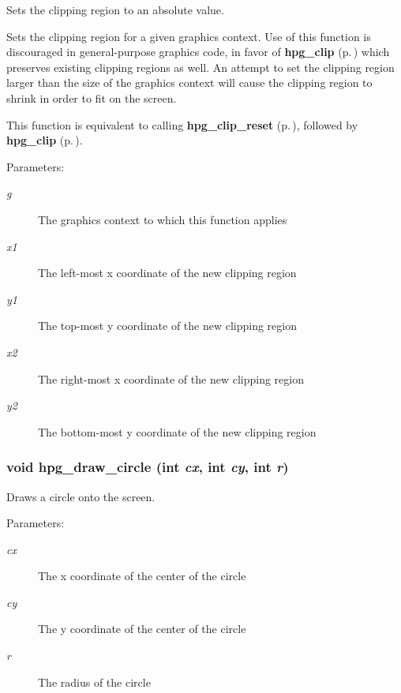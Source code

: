 Sets the clipping region to an absolute value.

Sets the clipping region for a given graphics context. Use of this function is discouraged in general-purpose graphics code, in favor of {\bf hpg\_\-clip} {\rm (p.\,\pageref{hpgraphics_8h_a37})} which preserves existing clipping regions as well. An attempt to set the clipping region larger than the size of the graphics context will cause the clipping region to shrink in order to fit on the screen.

This function is equivalent to calling {\bf hpg\_\-clip\_\-reset} {\rm (p.\,\pageref{hpgraphics_8h_a35})}, followed by {\bf hpg\_\-clip} {\rm (p.\,\pageref{hpgraphics_8h_a37})}.\begin{Desc}
\item[Parameters: ]\par
\begin{description}
\item[{\em 
g}]The graphics context to which this function applies \item[{\em 
x1}]The left-most x coordinate of the new clipping region \item[{\em 
y1}]The top-most y coordinate of the new clipping region \item[{\em 
x2}]The right-most x coordinate of the new clipping region \item[{\em 
y2}]The bottom-most y coordinate of the new clipping region \end{description}
\end{Desc}
\subsubsection{\setlength{\rightskip}{0pt plus 5cm}void hpg\_\-draw\_\-circle (int {\em cx}, int {\em cy}, int {\em r})}\label{hpgraphics_8h_a49}


Draws a circle onto the screen.

\begin{Desc}
\item[Parameters: ]\par
\begin{description}
\item[{\em 
cx}]The x coordinate of the center of the circle \item[{\em 
cy}]The y coordinate of the center of the circle \item[{\em 
r}]The radius of the circle \end{description}
\end{Desc}
